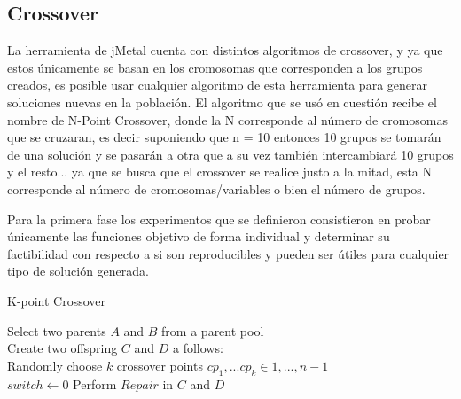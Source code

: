 
\subsection{Crossover}

La herramienta de jMetal cuenta con distintos algoritmos de crossover, y ya que estos únicamente se basan en los cromosomas que corresponden a los grupos creados, es posible usar cualquier algoritmo de esta herramienta para generar soluciones nuevas en la población. El algoritmo que se usó en cuestión recibe el nombre de N-Point Crossover, donde la N corresponde al número de cromosomas que se cruzaran, es decir suponiendo que n = 10 entonces 10 grupos se tomarán de una solución y se pasarán a otra que a su vez también intercambiará 10 grupos y el resto... ya que se busca que el crossover se realice justo a la mitad, esta N corresponde al número de cromosomas/variables o bien el número de grupos.

Para la primera fase los experimentos que se definieron consistieron en probar únicamente las funciones objetivo de forma individual y determinar su factibilidad con respecto a si son reproducibles y pueden ser útiles para cualquier tipo de solución generada.

\begin{algorithm}[H]
    \caption{K-point Crossover}
    \label{alg:crossover}
    \SetAlgoLined 
Select two parents $A$ and $B$ from a parent pool\;\\
Create two offspring $C$ and $D$ a follows:\;\\
Randomly choose $k$ crossover points $cp_1,...cp_k \in {1,...,n-1}$\;\\
$switch \gets 0$
Perform $Repair$ in $C$ and $D$
\end{algorithm}

